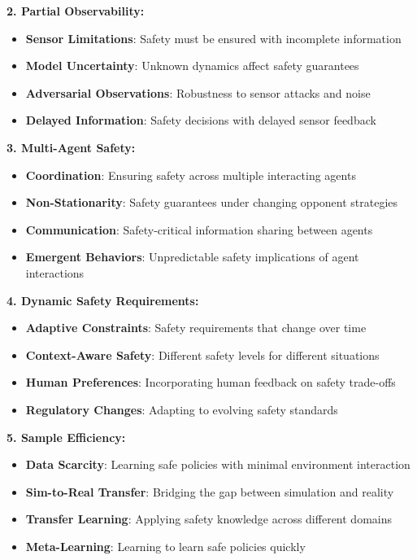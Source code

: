 \documentclass[12pt]{article}
\begin{document}
{{{{\textbf{2. Partial Observability:}
\begin{itemize}
\item \textbf{Sensor Limitations}: Safety must be ensured with incomplete information
\item \textbf{Model Uncertainty}: Unknown dynamics affect safety guarantees
\item \textbf{Adversarial Observations}: Robustness to sensor attacks and noise
\item \textbf{Delayed Information}: Safety decisions with delayed sensor feedback
\end{itemize}

\textbf{3. Multi-Agent Safety:}
\begin{itemize}
\item \textbf{Coordination}: Ensuring safety across multiple interacting agents
\item \textbf{Non-Stationarity}: Safety guarantees under changing opponent strategies
\item \textbf{Communication}: Safety-critical information sharing between agents
\item \textbf{Emergent Behaviors}: Unpredictable safety implications of agent interactions
\end{itemize}

\textbf{4. Dynamic Safety Requirements:}
\begin{itemize}
\item \textbf{Adaptive Constraints}: Safety requirements that change over time
\item \textbf{Context-Aware Safety}: Different safety levels for different situations
\item \textbf{Human Preferences}: Incorporating human feedback on safety trade-offs
\item \textbf{Regulatory Changes}: Adapting to evolving safety standards
\end{itemize}

\textbf{5. Sample Efficiency:}
\begin{itemize}
\item \textbf{Data Scarcity}: Learning safe policies with minimal environment interaction
\item \textbf{Sim-to-Real Transfer}: Bridging the gap between simulation and reality
\item \textbf{Transfer Learning}: Applying safety knowledge across different domains
\item \textbf{Meta-Learning}: Learning to learn safe policies quickly
\end{itemize}

}}}}
\end{document}
